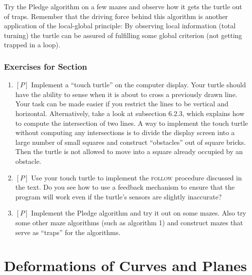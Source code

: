 \documentclass{book}
\begin{document}
Try the Pledge algorithm on a few mazes and observe how it gets the
turtle out of traps. Remember that the driving force behind this algorithm is another application of the local-global principle: By observing
local information (total turning) the turtle can be assured of fulfilling
some global criterion (not getting trapped in a loop).

\subsubsection{Exercises for Section \thesection}

\begin{enumerate}
\item $[P]$ Implement a ``touch turtle'' on the computer display. Your turtle
should have the ability to sense when it is about to cross a previously
drawn line. Your task can be made easier if you restrict the lines to be
vertical and horizontal. Alternatively, take a look at subsection 6.2.3,
which explains how to compute the intersection of two lines. A way
to implement the touch turtle without computing any intersections is
to divide the display screen into a large number of small squares and
construct ``obstacles'' out of square bricks. Then the turtle is not allowed
to move into a square already occupied by an obstacle.
\item $[P]$ Use your touch turtle to implement the \textsc{follow} procedure discussed in the text. Do you see how to use a feedback mechanism to
ensure that the program will work even if the turtle's sensors are slightly
inaccurate?
\item $[P]$ Implement the Pledge algorithm and try it out on some mazes.
Also try some other maze algorithms (such as algorithm 1) and construct
mazes that serve as ``traps'' for the algorithms.
\end{enumerate}

\section{Deformations of Curves and Planes}
\end{document}
